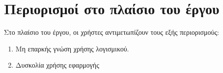 \section{Περιορισμοί στο πλαίσιο του έργου}

Στο πλαίσιο του έργου, οι χρήστες αντιμετωπίζουν τους εξής περιορισμούς:
\begin{enumerate}
	\item Μη επαρκής γνώση χρήσης λογισμικού.
  \item Δυσκολία χρήσης εφαρμογής
\end{enumerate}
